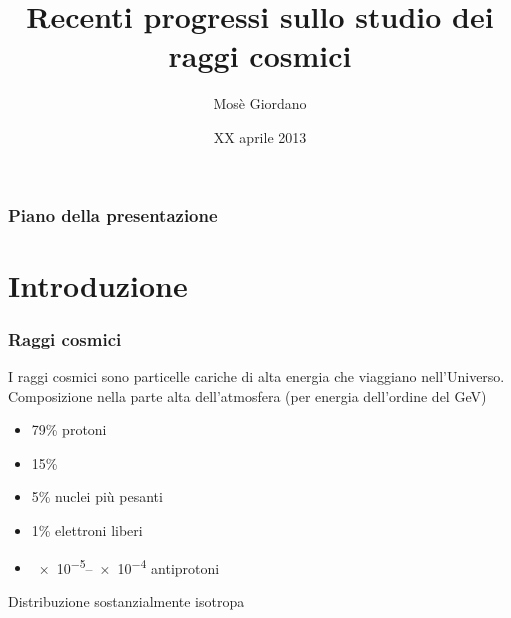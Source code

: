 \documentclass[10pt]{beamer}
\title{Recenti progressi sullo studio dei raggi cosmici}
\author{Mosè Giordano}
\date{XX aprile 2013}
\institute[UniSalento]{Università del Salento}
\begin{document}
\begin{frame}
  \maketitle
\end{frame}

\begin{frame}
  \frametitle{Piano della presentazione}
  \tableofcontents
\end{frame}

\section{Introduzione}


\begin{frame}
  \frametitle{Raggi cosmici}
  I \alert{raggi cosmici} sono \alert{particelle cariche di alta energia} che
  viaggiano nell'Universo.  Composizione nella parte alta dell'atmosfera (per
  energia dell'ordine del \si{\giga\electronvolt})
  \begin{itemize}
  \item 79\% protoni
  \item 15\% \PGa
  \item 5\% nuclei più pesanti
  \item 1\% elettroni liberi
  \item \numrange[range-phrase=--]{e-5}{e-4} antiprotoni
  \end{itemize}
  Distribuzione sostanzialmente isotropa
\end{frame}
\end{document}
